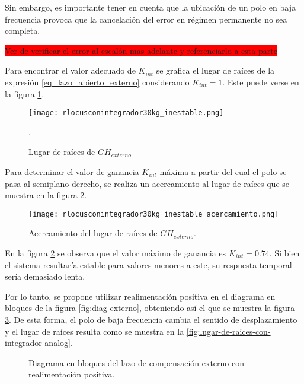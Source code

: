 Sin embargo, es importante tener en cuenta que la ubicación de un polo en baja frecuencia provoca que la cancelación del error en régimen permanente no sea completa.

\colorbox{red}{Ver de verificar el error al escalón mas adelante y referenciarlo a esta parte}

Para encontrar el valor adecuado de $K_{int}$ se grafica el lugar de raíces de la expresión \ref{eq_lazo_abierto_externo} considerando $K_{int}=1$. Este puede verse en la figura \ref{fig:lugar-de-raices-con-integrador-analog_inestable}.

\begin{figure}[H]
	\centering
	\texttt{[image: rlocusconintegrador30kg\_inestable.png]}
	\caption{Lugar de raíces de $GH_{externo}$}.
	\label{fig:lugar-de-raices-con-integrador-analog_inestable}
\end{figure}

Para determinar el valor de ganancia $K_{int}$ máxima a partir del cual el polo se pasa al semiplano derecho, se realiza un acercamiento al lugar de raíces que se muestra en la figura \ref{fig:lugar-de-raices-con-integrador-analog_inestable_acercamiento}. 

\begin{figure}[H]
	\centering
	\texttt{[image: rlocusconintegrador30kg\_inestable\_acercamiento.png]}
	\caption{Acercamiento del lugar de raíces de $GH_{externo}$.}
	\label{fig:lugar-de-raices-con-integrador-analog_inestable_acercamiento}
\end{figure}

En la figura \ref{fig:lugar-de-raices-con-integrador-analog_inestable_acercamiento} se observa que el valor máximo de ganancia es $K_{int}=0.74$. Si bien el sistema resultaría estable para valores menores a este, su respuesta temporal sería demasiado lenta. 

Por lo tanto, se propone utilizar realimentación positiva en el diagrama en bloques de la figura \ref{fig:diag-externo}, obteniendo así el que se muestra la figura \ref{fig:diag-externo_real_positiva}. De esta forma, el polo de baja frecuencia cambia el sentido de desplazamiento y el lugar de raíces resulta como se muestra en la \ref{fig:lugar-de-raices-con-integrador-analog}.


\begin{figure}[H]
	\centering
	
	\caption{Diagrama en bloques del lazo de compensación externo con realimentación positiva.}	
	\label{fig:diag-externo_real_positiva}
\end{figure}


